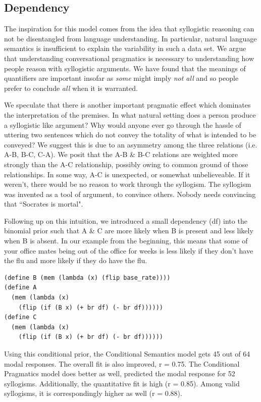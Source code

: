 \documentclass[10pt,letterpaper]{article}
\begin{document}
\subsection{Dependency}

The inspiration for this model comes from the idea that syllogistic reasoning can not be disentangled from language understanding. In particular, natural language semantics is insufficient to explain the variability in such a data set. We argue that understanding conversational pragmatics is necessary to understanding how people reason with syllogistic arguments. We have found that the meanings of quantifiers are important insofar as \emph{some} might imply \emph{not all} and so people prefer to conclude \emph{all} when it is warranted. 

We speculate that there is another important pragmatic effect which dominates the interpretation of the premises. In what natural setting does a person produce a syllogistic like argument? Why would anyone ever go through the hassle of uttering two sentences which do not convey the totality of what is intended to be conveyed? We suggest this is due to an asymmetry among the three relations (i.e. A-B, B-C, C-A). We posit that the A-B \& B-C relations are weighted more strongly than the A-C relationship, possibly owing to common ground of those relationships. In some way, A-C is unexpected, or somewhat unbelieveable. If it weren't, there would be no reason to work through the syllogism. The syllogism was invented as a tool of argument, to convince others. Nobody needs convincing that ``Socrates is mortal". 

Following up on this intuition, we introduced a small dependency (df) into the binomial prior such that A \& C are more likely when B is present and less likely when B is absent. In our example from the beginning, this means that some of your office mates being out of the office for weeks is less likely if they don't have the flu and more likely if they do have the flu. 


\begin{lstlisting}
(define B (mem (lambda (x) (flip base_rate))))
(define A 
  (mem (lambda (x) 
    (flip (if (B x) (+ br df) (- br df))))))
(define C 
  (mem (lambda (x) 
    (flip (if (B x) (+ br df) (- br df))))))
\end{lstlisting}

Using this conditional prior, the Conditional Semantics model gets 45 out of 64 modal responses. The overall fit is also improved, r = 0.75. The Conditional Pragmatics model does better as well, predicted the modal response for 52 syllogisms. Additionally, the quantitative fit is high (r = 0.85). Among valid syllogisms, it is correspondingly higher as well (r = 0.88). 
\end{document}
